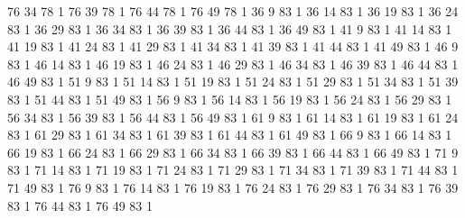 	76	34	78	1
	76	39	78	1
	76	44	78	1
	76	49	78	1
	36	9	83	1
	36	14	83	1
	36	19	83	1
	36	24	83	1
	36	29	83	1
	36	34	83	1
	36	39	83	1
	36	44	83	1
	36	49	83	1
	41	9	83	1
	41	14	83	1
	41	19	83	1
	41	24	83	1
	41	29	83	1
	41	34	83	1
	41	39	83	1
	41	44	83	1
	41	49	83	1
	46	9	83	1
	46	14	83	1
	46	19	83	1
	46	24	83	1
	46	29	83	1
	46	34	83	1
	46	39	83	1
	46	44	83	1
	46	49	83	1
	51	9	83	1
	51	14	83	1
	51	19	83	1
	51	24	83	1
	51	29	83	1
	51	34	83	1
	51	39	83	1
	51	44	83	1
	51	49	83	1
	56	9	83	1
	56	14	83	1
	56	19	83	1
	56	24	83	1
	56	29	83	1
	56	34	83	1
	56	39	83	1
	56	44	83	1
	56	49	83	1
	61	9	83	1
	61	14	83	1
	61	19	83	1
	61	24	83	1
	61	29	83	1
	61	34	83	1
	61	39	83	1
	61	44	83	1
	61	49	83	1
	66	9	83	1
	66	14	83	1
	66	19	83	1
	66	24	83	1
	66	29	83	1
	66	34	83	1
	66	39	83	1
	66	44	83	1
	66	49	83	1
	71	9	83	1
	71	14	83	1
	71	19	83	1
	71	24	83	1
	71	29	83	1
	71	34	83	1
	71	39	83	1
	71	44	83	1
	71	49	83	1
	76	9	83	1
	76	14	83	1
	76	19	83	1
	76	24	83	1
	76	29	83	1
	76	34	83	1
	76	39	83	1
	76	44	83	1
	76	49	83	1
				
				
				
				
				
